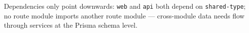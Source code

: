 Dependencies only point downwards: \texttt{web} and \texttt{api} both depend on \texttt{shared-type}; no route module imports another route module --- cross-module data needs flow through services at the Prisma schema level.

